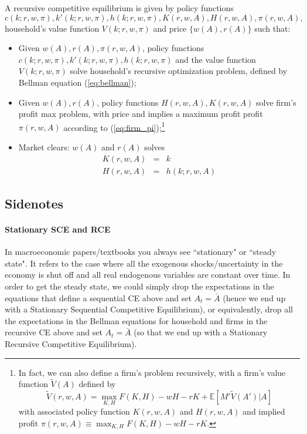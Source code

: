 \documentclass[12pt]{article}
\begin{document}
A recursive competitive equilibrium is given by policy functions
\[c(k; r, w, \pi), k'(k; r,w,\pi), h(k; r, w, \pi), K(r,w,A), H(r,w, A), \pi(r,w, A), \]
household's value function $V(k; r, w, \pi)$ and price $\{w(A), r(A)\}$ such that:
\begin{itemize}
	\item Given $w(A), r(A), \pi(r,w, A)$, policy functions $c(k; r, w, \pi), k'(k; r,w,\pi), h(k; r, w, \pi)$ and the value function $V(k; r, w, \pi)$ solve household's recursive optimization problem, defined by Bellman equation (\ref{eq:bellman});
	\item Given $w(A), r(A)$, policy functions $H(r,w, A), K(r, w, A)$ solve firm's profit max problem, with price and implies a maximum profit profit $\pi(r,w, A)$ according to (\ref{eq:firm_pi});\footnote{In fact, we can also define a firm's problem recursively, with a firm's value function $\tilde{V}(A)$ defined by \[\tilde{V}(r,w, A) = \max_{K,H} F(K,H) - wH - rK + \mathbb{E} \left[M' \tilde{V}(A')\big|A\right]\] with associated policy function $K(r,w,A)$ and $H(r,w,A)$ and implied profit $\pi(r,w, A) \equiv \max_{K,H} F(K,H) - wH - rK$.}
	\item Market clears: $w(A)$ and $r(A)$ solves
	\begin{eqnarray}
		K(r,w,A) &=& k \\
		H(r,w,A) &=& h(k; r, w, A)
	\end{eqnarray}
\end{itemize}

\subsection{Sidenotes}

\paragraph{Stationary SCE and RCE} In macroeconomic papers/textbooks you always see ``stationary" or ``steady state". It refers to the case where all the exogenous shocks/uncertainty in the economy is shut off and all real endogenous variables are constant over time. In order to get the steady state, we could simply drop the expectations in the equations that define a sequential CE above and set $A_t = \bar{A}$ (hence we end up with a Stationary Sequential Competitive Equilibrium), or equivalently, drop all the expectations in the Bellman equations for household and firms in the recursive CE above and set $A_t = \bar{A}$ (so that we end up with a Stationary Recursive Competitive Equilibrium).
\end{document}

